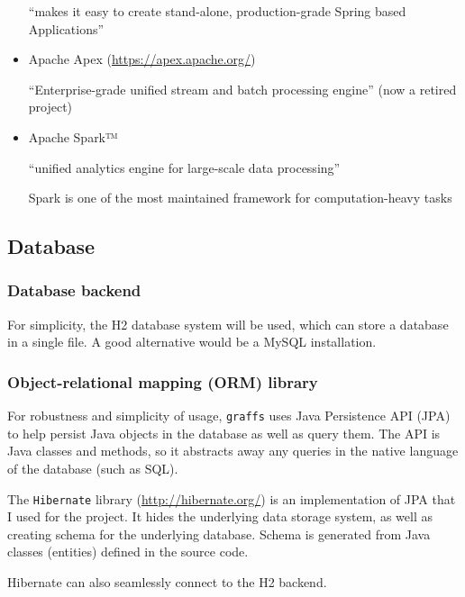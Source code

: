 \begin{itemize}
                \enquote{makes it easy to create stand-alone, production-grade Spring based Applications}
            \item Apache Apex (\url{https://apex.apache.org/})
                
                \enquote{Enterprise-grade unified stream and batch processing engine} (now a retired project)
            \item Apache Spark™
                
                \enquote{unified analytics engine for large-scale data processing}
                
                Spark is one of the most maintained framework for computation-heavy tasks
        \end{itemize}
    
    \subsection{Database}
        
        \subsubsection{Database backend}
        
            For simplicity, the H2 database system will be used, which can store a database in a single file. A good alternative would be a MySQL installation.
        
        \subsubsection{Object-relational mapping (ORM) library}
        
            For robustness and simplicity of usage, \texttt{graffs} uses Java Persistence API (JPA) to help persist Java objects in the database as well as query them. The API is Java classes and methods, so it abstracts away any queries in the native language of the database (such as SQL).
            
            The \texttt{Hibernate} library (\url{http://hibernate.org/}) is an implementation of JPA that I used for the project. It hides the underlying data storage system, as well as creating schema for the underlying database. Schema is generated from Java classes (entities) defined in the source code.
            
            Hibernate can also seamlessly connect to the H2 backend.
            
